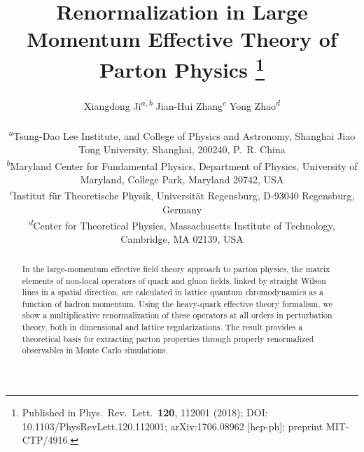\documentclass[11pt]{article}
\title{Renormalization in Large Momentum Effective Theory of Parton Physics%
\thanks{Published in Phys.\ Rev.\ Lett.\ \textbf{120}, 112001 (2018);
DOI: 10.1103/PhysRevLett.120.112001; arXiv:1706.08962 [hep-ph]; preprint MIT-CTP/4916.}}
\author{Xiangdong Ji\textsuperscript{$a,b$}\quad
        Jian-Hui Zhang\textsuperscript{$c$}\quad
        Yong Zhao\textsuperscript{$d$}\\[8pt]
\normalsize
\begin{minipage}{0.95\textwidth}\raggedright\footnotesize
\textsuperscript{$a$}Tsung-Dao Lee Institute, and College of Physics and Astronomy, Shanghai Jiao Tong University, Shanghai, 200240, P.~R. China\\
\textsuperscript{$b$}Maryland Center for Fundamental Physics, Department of Physics, University of Maryland, College Park, Maryland 20742, USA\\
\textsuperscript{$c$}Institut f\"ur Theoretische Physik, Universit\"at Regensburg, D-93040 Regensburg, Germany\\
\textsuperscript{$d$}Center for Theoretical Physics, Massachusetts Institute of Technology, Cambridge, MA 02139, USA
\end{minipage}}
\date{}
\begin{document}
\maketitle

\begin{abstract}
In the large-momentum effective field theory approach to parton physics,
the matrix elements of non-local operators of quark and gluon fields, linked by straight
Wilson lines in
a spatial direction, are calculated in lattice quantum chromodynamics as a function of hadron momentum.
Using the heavy-quark effective theory formalism, we show a multiplicative renormalization
of these operators at all orders in perturbation theory, both in dimensional and lattice
regularizations. The result provides a theoretical basis for
extracting parton properties through properly renormalized observables
in Monte Carlo simulations.
\end{abstract}








\end{document}
